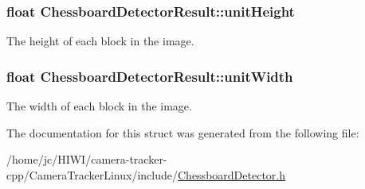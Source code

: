 \subsubsection[{\texorpdfstring{unit\+Height}{unitHeight}}]{\setlength{\rightskip}{0pt plus 5cm}float Chessboard\+Detector\+Result\+::unit\+Height}\hypertarget{struct_chessboard_detector_result_a95e32f26ef920afcc1e64af548120285}{}\label{struct_chessboard_detector_result_a95e32f26ef920afcc1e64af548120285}
The height of each block in the image. 
\subsubsection[{\texorpdfstring{unit\+Width}{unitWidth}}]{\setlength{\rightskip}{0pt plus 5cm}float Chessboard\+Detector\+Result\+::unit\+Width}\hypertarget{struct_chessboard_detector_result_a967889233f9ea3e34e7b215041105801}{}\label{struct_chessboard_detector_result_a967889233f9ea3e34e7b215041105801}
The width of each block in the image. 

The documentation for this struct was generated from the following file\+:\begin{DoxyCompactItemize}
\item 
/home/jc/\+H\+I\+W\+I/camera-\/tracker-\/cpp/\+Camera\+Tracker\+Linux/include/\hyperlink{_chessboard_detector_8h}{Chessboard\+Detector.\+h}\end{DoxyCompactItemize}
